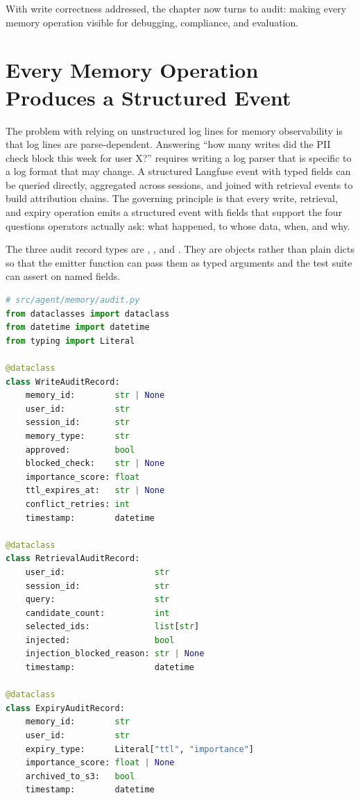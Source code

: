 With write correctness addressed, the chapter now turns to audit: making every
memory operation visible for debugging, compliance, and evaluation.

\section{Every Memory Operation Produces a Structured Event}
\label{sec:audit-trail}

The problem with relying on unstructured log lines for memory observability is
that log lines are parse-dependent. Answering ``how many writes did the PII
check block this week for user X?'' requires writing a log parser that is
specific to a log format that may change. A structured Langfuse event with
typed fields can be queried directly, aggregated across sessions, and joined
with retrieval events to build attribution chains. The governing principle is
that every write, retrieval, and expiry operation emits a structured event with
fields that support the four questions operators actually ask: what happened,
to whose data, when, and why.

The three audit record types are ,
, and . They are
 objects rather than plain dicts so that the emitter function
can pass them as typed arguments and the test suite can assert on named fields.

\begin{lstlisting}[language=Python,
  caption={Three audit dataclasses and their Langfuse emitters},
  label={lst:audit-records}]
# src/agent/memory/audit.py
from dataclasses import dataclass
from datetime import datetime
from typing import Literal

@dataclass
class WriteAuditRecord:
    memory_id:        str | None
    user_id:          str
    session_id:       str
    memory_type:      str
    approved:         bool
    blocked_check:    str | None
    importance_score: float
    ttl_expires_at:   str | None
    conflict_retries: int
    timestamp:        datetime

@dataclass
class RetrievalAuditRecord:
    user_id:                  str
    session_id:               str
    query:                    str
    candidate_count:          int
    selected_ids:             list[str]
    injected:                 bool
    injection_blocked_reason: str | None
    timestamp:                datetime

@dataclass
class ExpiryAuditRecord:
    memory_id:        str
    user_id:          str
    expiry_type:      Literal["ttl", "importance"]
    importance_score: float | None
    archived_to_s3:   bool
    timestamp:        datetime
\end{lstlisting}

